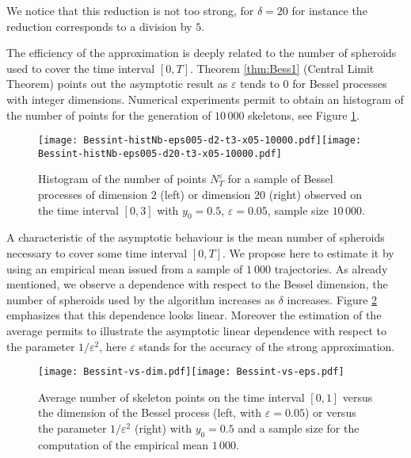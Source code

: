 \documentclass[12pt]{article}
\numberwithin{equation}{section}
\begin{document}
We notice that this reduction is not too strong, for $\delta=20$ for instance the reduction corresponds to a division by $5$.




The efficiency of the approximation is deeply related to the number of spheroids used to cover the time interval $[0,T]$. Theorem \ref{thm:Bess1} (Central Limit Theorem) points out the asymptotic result as $\varepsilon$ tends to $0$ for Bessel processes with integer dimensions. Numerical experiments permit to obtain an histogram of the number of points for the generation of $10\,000$ skeletons, see Figure \ref{fig:my_label}.

\begin{figure}[h]
\centering
\texttt{[image: Bessint-histNb-eps005-d2-t3-x05-10000.pdf]}\hspace*{-0.5cm}\texttt{[image: Bessint-histNb-eps005-d20-t3-x05-10000.pdf]}
\caption{\small Histogram of the number of points $N_T^\varepsilon$ for a sample of Bessel processes of dimension $2$ (left) or dimension $20$ (right) observed on the time interval $[0,3]$ with $y_0=0.5$, $\varepsilon=0.05$, sample size $10\,000$.}
\label{fig:my_label}
\end{figure}

A characteristic of the asymptotic behaviour is the mean number of spheroids necessary to cover some time interval $[0,T]$. We propose here to estimate it by using an empirical mean issued from a sample of $1\ 000$ trajectories. As already mentioned, we observe a dependence with respect to the Bessel dimension, the number of spheroids used by the algorithm increases as $\delta$ increases. Figure \ref{fig:my_labell} emphasizes that this dependence looks linear. Moreover the estimation of the average permits to illustrate the asymptotic linear dependence with respect to the parameter $1/\varepsilon^2$, here $\varepsilon$ stands for the accuracy of the strong approximation. 

\begin{figure}[H]
\centering
\texttt{[image: Bessint-vs-dim.pdf]}\hspace*{-0.5cm}\texttt{[image: Bessint-vs-eps.pdf]}
\caption{\small Average number of skeleton points on the time interval $[0,1]$ versus the dimension of the Bessel process (left, with $\varepsilon=0.05$) or versus the parameter $1/\varepsilon^2$ (right) with $y_0=0.5$ and a sample size for the computation of the empirical mean $1\,000$.}
\label{fig:my_labell}
\end{figure}
\end{document}
